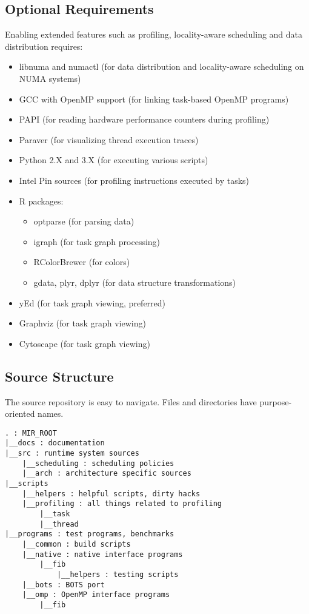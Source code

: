\documentclass[11pt,a4paper]{article}
\begin{document}
\subsection{Optional Requirements}\label{optional-requirements}

Enabling extended features such as profiling, locality-aware scheduling
and data distribution requires:

\begin{itemize}
\item libnuma and numactl (for data distribution and locality-aware scheduling on NUMA systems)
\item GCC with OpenMP support (for linking task-based OpenMP programs)
\item PAPI (for reading hardware performance counters during profiling)
\item Paraver (for visualizing thread execution traces)
\item Python 2.X and 3.X (for executing various scripts)
\item Intel Pin sources (for profiling instructions executed by tasks)
\item R packages:
  \begin{itemize}
  \item optparse (for parsing data)
  \item igraph (for task graph processing)
  \item RColorBrewer (for colors)
  \item gdata, plyr, dplyr (for data structure transformations)
  \end{itemize}
\item yEd (for task graph viewing, preferred)
\item Graphviz (for task graph viewing)
\item Cytoscape (for task graph viewing)
\end{itemize}

\subsection{Source Structure}\label{source-structure}

The source repository is easy to navigate. Files and directories have purpose-oriented names.

\begin{lstlisting}[style=MyInputStyle]
. : MIR_ROOT
|__docs : documentation
|__src : runtime system sources
    |__scheduling : scheduling policies
    |__arch : architecture specific sources 
|__scripts 
    |__helpers : helpful scripts, dirty hacks
    |__profiling : all things related to profiling
        |__task 
        |__thread
|__programs : test programs, benchmarks
    |__common : build scripts
    |__native : native interface programs
        |__fib
            |__helpers : testing scripts
    |__bots : BOTS port
    |__omp : OpenMP interface programs
        |__fib
\end{lstlisting}
\end{document}
